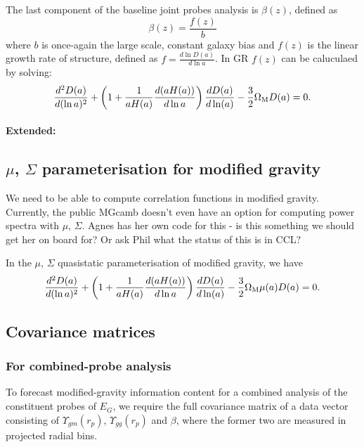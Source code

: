 \documentclass[onecolumn,amsmath,aps,fleqn, superscriptaddress]{revtex4}
\begin{document}
The last component of the baseline joint probes analysis is $\beta(z)$, defined as 
\begin{equation}
\beta(z) = \frac{f(z)}{b}
\label{beta}
\end{equation}
where $b$ is once-again the large scale, constant galaxy bias and $f(z)$ is the linear growth rate of structure, defined as $f = \frac{d \ln D(a)}{d\ln a}$. In GR $f(z)$ can be caluculaed by solving:
\begin{equation}
\frac{d^2 D(a)}{d (\ln a)^2} + \left(1 + \frac{1}{a H(a)}\frac{d(a H(a))}{d \ln a}\right)\frac{d D(a)}{d \ln(a)} - \frac{3}{2} \Omega_{\rm M} D(a) = 0.
\label{beta}
\end{equation}

\paragraph*{Extended:}

\subsection{$\mu$, $\Sigma$ parameterisation for modified gravity}

{\color{cyan} We need to be able to compute correlation functions in modified gravity. Currently, the public MGcamb doesn't even have an option for computing power spectra with $\mu$, $\Sigma$. Agnes has her own code for this - is this something we should get her on board for? Or ask Phil what the status of this is in CCL?}

In the $\mu$, $\Sigma$ quasistatic parameterisation of modified gravity, we have
\begin{equation}
\frac{d^2 D(a)}{d (\ln a)^2} + \left(1 + \frac{1}{a H(a)}\frac{d(a H(a))}{d \ln a}\right)\frac{d D(a)}{d \ln(a)} - \frac{3}{2} \Omega_{\rm M} \mu(a) D(a) = 0.
\label{beta_mu}
\end{equation}



\subsection{Covariance matrices}
\subsubsection{For combined-probe analysis}
To forecast modified-gravity information content for a combined analysis of the constituent probes of $E_G$, we require the full covariance matrix of a data vector consisting of $\Upsilon_{gm}(r_p)$, $\Upsilon_{gg}(r_p)$ and $\beta$, where the former two are measured in projected radial bins. 
\end{document}
